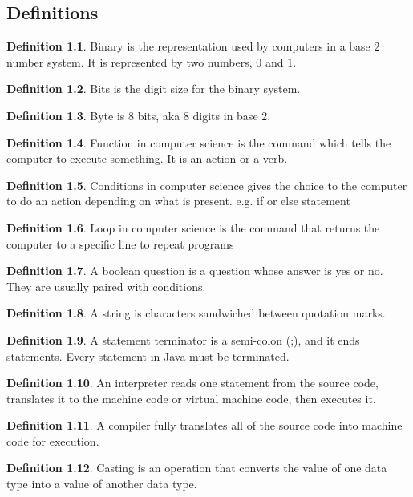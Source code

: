 \documentclass[11pt,a4 paper]{book}
\theoremstyle{plain}
\theoremstyle{definition}
\newtheorem{defn}{Definition}[section]
\theoremstyle{remark}
\begin{document}
\begin{flushleft}
\chapter{Definitions}
\begin{defn}Binary is the representation used by computers in a base $2$ number system. It is represented by two numbers, $0$ and $1$.
\end{defn}
\begin{defn}
Bits is the digit size for the binary system.
\end{defn}
\begin{defn}
Byte is 8 bits, aka 8 digits in base $2$.
\end{defn}
\begin{defn}
Function in computer science is the command which tells the computer to execute something. It is an action or a verb.
\end{defn}
\begin{defn}
Conditions in computer science gives the choice to the computer to do an action depending on what is present. e.g. if or else statement
\end{defn}
\begin{defn}
Loop in computer science is the command that returns the computer to a specific line to repeat programs
\end{defn}
\begin{defn}
A boolean question is a question whose answer is yes or no. They are usually paired with conditions.
\end{defn}
\begin{defn}
A string is characters sandwiched between quotation marks.
\end{defn}
\begin{defn}
A statement terminator is a semi-colon (;), and it ends statements. Every statement in Java must be terminated. 
\end{defn}
\begin{defn}
An interpreter reads one statement from the source code, translates it to the machine 
code or virtual machine code, then executes it.
\end{defn}
\begin{defn}
A compiler fully translates all of the source code into machine code for execution.
\end{defn}
\begin{defn}
Casting is an operation that converts the value of one data type into a value of another data type.
\end{defn}

\end{flushleft}
\end{document}
